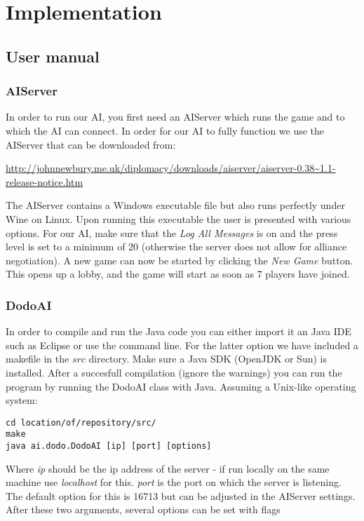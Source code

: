 \documentclass[a4paper]{article} %
\begin{document}
\section{Implementation}
\subsection{User manual}

\subsubsection{AIServer}
In order to run our AI, you first need an AIServer which runs the game and to which the AI can connect. In order for our AI to fully function we use the AIServer that can be downloaded from: 

\noindent\url{http://johnnewbury.me.uk/diplomacy/downloads/aiserver/aiserver-0.38~1.1-release-notice.htm}

The AIServer contains a Windows executable file but also runs perfectly under Wine on Linux. Upon running this executable the user is presented with various options. For our AI, make sure that the \textit{Log All Messages} is on and the press level is set to a minimum of 20 (otherwise the server does not allow for alliance negotiation). A new game can now be started by clicking the \textit{New Game} button. This opens up a lobby, and the game will start as soon as 7 players have joined.     

\subsubsection{DodoAI}
In order to compile and run the Java code you can either import it an Java IDE such as Eclipse or use the command line. For the latter option we have included a makefile in the $src$ directory. Make sure a Java SDK (OpenJDK or Sun) is installed. After a succesfull compilation (ignore the warnings) you can run the program by running the DodoAI class with Java. Assuming a Unix-like operating system:       
\begin{lstlisting}[frame=single] 
cd location/of/repository/src/
make
java ai.dodo.DodoAI [ip] [port] [options]
\end{lstlisting}

Where \textit{ip} should be the ip address of the server - if run locally on the same machine use \textit{localhost} for this. \textit{port} is the port on which the server is listening. The default option for this is 16713 but can be adjusted in the AIServer settings. After these two arguments, several options can be set with flags
\end{document}
